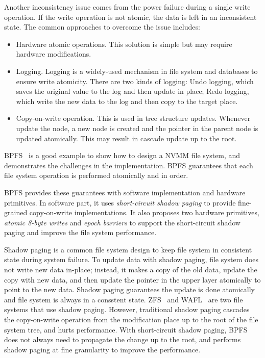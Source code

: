 Another inconsistency issue comes from the power failure during a single
write operation. If the write operation is not atomic, the data is left
in an inconsistent state. The common approaches to overcome the issue includes:

\begin{itemize}
\item Hardware atomic operations. This solution is simple but may require
hardware modifications.
\item Logging. Logging is a widely-used mechanism in file system and databases
to ensure write atomicity. There are two kinds of logging: Undo logging, which
saves the original value to the log and then update in place; Redo logging,
which write the new data to the log and then copy to the target place.
\item Copy-on-write operation. This is used in tree structure updates. Whenever
update the node, a new node is created and the pointer in the parent node is
updated atomically. This may result in cascade update up to the root.
\end{itemize}


BPFS~\cite{BPFS} is a good example to show how to design a NVMM file system,
and demonstrates the challenges in the implementation. BPFS guarantees that
each file system operation is performed atomically and in order.

BPFS provides these guarantees with software implementation and hardware
primitives. In software part, it uses \emph{short-circuit shadow paging}
to provide fine-grained copy-on-write implementations. It also proposes
two hardware primitives, \emph{atomic 8-byte writes} and \emph{epoch barriers}
to support the short-circuit shadow paging and improve the file system
performance.

Shadow paging is a common file system design to keep file system in consistent
state during system failure. To update data with shadow paging, file system
does not write new data in-place; instead, it makes a copy of the old data,
update the copy with new data, and then update the pointer in the upper layer
atomically to point to the new data. Shadow paging guarantees the update is done
atomically and file system is always in a consstent state.
 ZFS~\cite{zfs} and WAFL~\cite{wafl} are two file
systems that use shadow paging. However, traditional shadow paging cascades
the copy-on-write operation from the modification place up to the root of 
the file system tree, and hurts performance. With short-circuit shadow paging,
BPFS does not always need to propagate the change up to the root, and performs
shadow paging at fine granularity to improve the performance.

